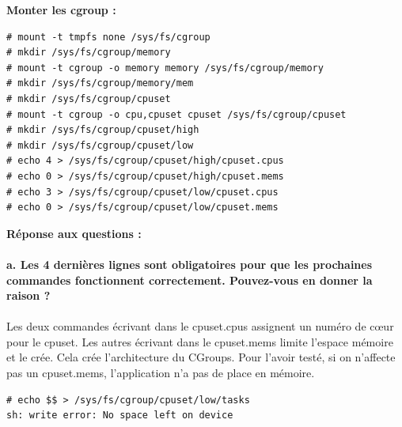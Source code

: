 \textbf{Monter les cgroup : } 
\begin{lstlisting}
# mount -t tmpfs none /sys/fs/cgroup                                            
# mkdir /sys/fs/cgroup/memory                                                   
# mount -t cgroup -o memory memory /sys/fs/cgroup/memory                        
# mkdir /sys/fs/cgroup/memory/mem         
# mkdir /sys/fs/cgroup/cpuset                                                   
# mount -t cgroup -o cpu,cpuset cpuset /sys/fs/cgroup/cpuset                    
# mkdir /sys/fs/cgroup/cpuset/high         
# mkdir /sys/fs/cgroup/cpuset/low  
# echo 4 > /sys/fs/cgroup/cpuset/high/cpuset.cpus                               
# echo 0 > /sys/fs/cgroup/cpuset/high/cpuset.mems                               
# echo 3 > /sys/fs/cgroup/cpuset/low/cpuset.cpus                                
# echo 0 > /sys/fs/cgroup/cpuset/low/cpuset.mems                                 
\end{lstlisting}

\textbf{Réponse aux questions :}\\\\
\textbf{a. Les	4	dernières	lignes	sont	obligatoires	pour que	les	prochaines	commandes	fonctionnent	
	correctement. Pouvez-vous	en	donner	la	raison ?}\\\\
Les deux commandes écrivant dans le cpuset.cpus assignent un numéro de cœur pour le cpuset. Les autres écrivant dans le cpuset.mems limite l'espace mémoire et le crée. Cela crée l'architecture du CGroups. Pour l'avoir testé, si on n'affecte pas un cpuset.mems, l'application n'a pas de place en mémoire.
\begin{lstlisting}
# echo $$ > /sys/fs/cgroup/cpuset/low/tasks
sh: write error: No space left on device
\end{lstlisting}

